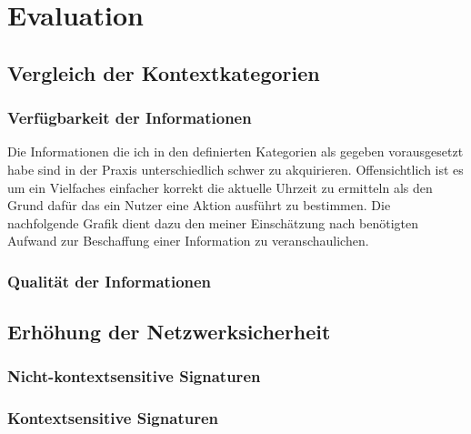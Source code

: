 \chapter{Evaluation}%
\label{cha:evaluation}



\section{Vergleich der Kontextkategorien} 
\subsection{Verfügbarkeit der Informationen}
Die Informationen die ich in den definierten Kategorien als gegeben vorausgesetzt habe sind in der Praxis unterschiedlich schwer zu akquirieren. Offensichtlich ist es um ein Vielfaches einfacher korrekt die aktuelle Uhrzeit zu ermitteln als den Grund dafür das ein Nutzer eine Aktion ausführt zu bestimmen. Die nachfolgende Grafik dient dazu den meiner Einschätzung nach benötigten Aufwand zur Beschaffung einer Information zu veranschaulichen.
\subsection{Qualität der Informationen}


\section{Erhöhung der Netzwerksicherheit}
\subsection{Nicht-kontextsensitive Signaturen}
\subsection{Kontextsensitive Signaturen} 
